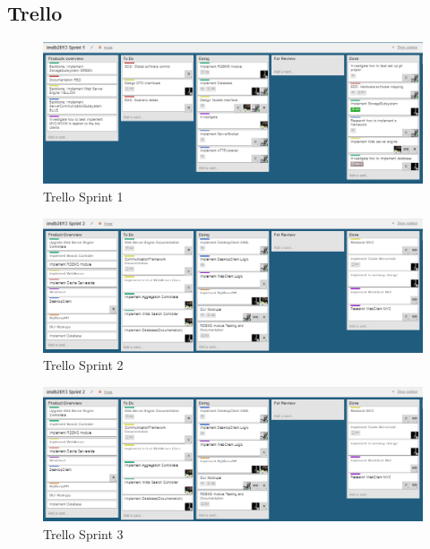 \subsection{Trello}



\begin{figure}[h]
\begin{center}
\includegraphics[scale=0.5]{img/SCRUM/trelloSprint1.png}
\caption{Trello Sprint 1}
\label{fig:Trello Sprint 1}
\end{center}
\end{figure}

\begin{figure}[h]
\begin{center}
\includegraphics[scale=0.5]{img/SCRUM/trelloSprint2.png}
\caption{Trello Sprint 2}
\label{fig:Trello Sprint 2}
\end{center}
\end{figure}

\begin{figure}[h]
\begin{center}
\includegraphics[scale=0.5]{img/SCRUM/trelloSprint2.png}
\caption{Trello Sprint 3}
\label{fig:Trello Sprint 3}
\end{center}
\end{figure}          
